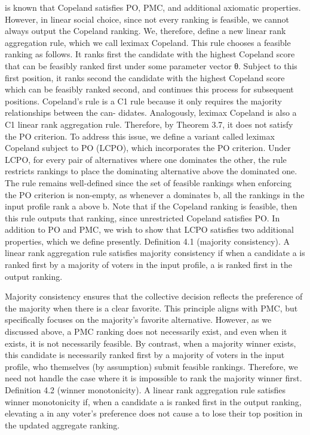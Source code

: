 \documentclass[10pt]{article}
\begin{document}
\begin{ReviewVerbatim}
is known that Copeland satisfies PO, PMC, and additional axiomatic properties. However, in linear
social choice, since not every ranking is feasible, we cannot always output the Copeland ranking.
We, therefore, define a new linear rank aggregation rule, which we call leximax Copeland. This
rule chooses a feasible ranking as follows. It ranks first the candidate with the highest Copeland
score that can be feasibly ranked first under some parameter vector θ. Subject to this first position,
it ranks second the candidate with the highest Copeland score which can be feasibly ranked second,
and continues this process for subsequent positions.
Copeland’s rule is a C1 rule because it only requires the majority relationships between the can-
didates. Analogously, leximax Copeland is also a C1 linear rank aggregation rule. Therefore, by
Theorem 3.7, it does not satisfy the PO criterion. To address this issue, we define a variant called
leximax Copeland subject to PO (LCPO), which incorporates the PO criterion. Under LCPO, for
every pair of alternatives where one dominates the other, the rule restricts rankings to place the
dominating alternative above the dominated one.
The rule remains well-defined since the set of feasible rankings when enforcing the PO criterion is
non-empty, as whenever a dominates b, all the rankings in the input profile rank a above b. Note that
if the Copeland ranking is feasible, then this rule outputs that ranking, since unrestricted Copeland
satisfies PO.
In addition to PO and PMC, we wish to show that LCPO satisfies two additional properties, which
we define presently.
Definition 4.1 (majority consistency). A linear rank aggregation rule satisfies majority consistency
if when a candidate a is ranked first by a majority of voters in the input profile, a is ranked first in
the output ranking.

Majority consistency ensures that the collective decision reflects the preference of the majority when
there is a clear favorite. This principle aligns with PMC, but specifically focuses on the majority’s
favorite alternative. However, as we discussed above, a PMC ranking does not necessarily exist, and
even when it exists, it is not necessarily feasible. By contrast, when a majority winner exists, this
candidate is necessarily ranked first by a majority of voters in the input profile, who themselves (by
assumption) submit feasible rankings. Therefore, we need not handle the case where it is impossible
to rank the majority winner first.
Definition 4.2 (winner monotonicity). A linear rank aggregation rule satisfies winner monotonicity
if, when a candidate a is ranked first in the output ranking, elevating a in any voter’s preference
does not cause a to lose their top position in the updated aggregate ranking.


\end{ReviewVerbatim}
\end{document}
